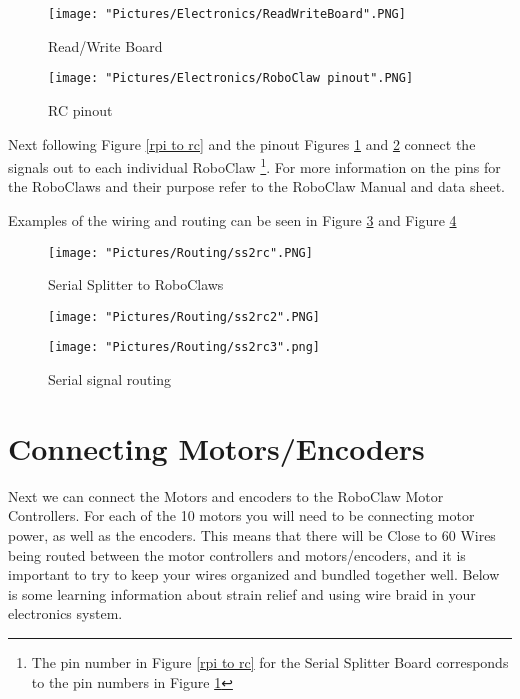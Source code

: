 \documentclass[12pt]{article}
\begin{document}
\begin{figure}[H]
 	\centering
	\texttt{[image: "Pictures/Electronics/ReadWriteBoard".PNG]}
 	\caption{Read/Write Board}
	\label{Read/Write Board}
\end{figure}

\begin{figure}[H]
 	\centering
	\texttt{[image: "Pictures/Electronics/RoboClaw pinout".PNG]}
 	\caption{RC pinout}
	\label{RC pinout}
\end{figure}

Next following Figure \ref{rpi to rc} and the pinout Figures \ref{Read/Write Board} and \ref{RC pinout} connect the signals out to each individual RoboClaw \footnote{The pin number in Figure \ref{rpi to rc} for the Serial Splitter Board corresponds to the pin numbers in Figure \ref{Read/Write Board}}. For more information on the pins for the RoboClaws and their purpose refer to the RoboClaw Manual and data sheet. 

\noindent Examples of the wiring and routing can be seen in Figure \ref{ss2rc1} and Figure \ref{ss2rc2}

\begin{figure}[H]
 	\centering
	\texttt{[image: "Pictures/Routing/ss2rc".PNG]}
 	\caption{Serial Splitter to RoboClaws}
	\label{ss2rc1}
\end{figure}

\begin{figure}[H]
 	\centering
  	\begin{minipage}[b]{0.50\textwidth}
		\texttt{[image: "Pictures/Routing/ss2rc2".PNG]}
  	\end{minipage}
  	\hfill
  	\begin{minipage}[b]{0.40\textwidth}
    		\texttt{[image: "Pictures/Routing/ss2rc3".png]}
  	\end{minipage}
	\caption{Serial signal routing}
	\label{ss2rc2}
\end{figure}

\section{Connecting Motors/Encoders}

Next we can connect the Motors and encoders to the RoboClaw Motor Controllers. For each of the 10 motors you will need to be connecting motor power, as well as the encoders. This means that there will be Close to 60 Wires being routed between the motor controllers and motors/encoders, and it is important to try to keep your wires organized and bundled together well. Below is some learning information about strain relief and using wire braid in your electronics system.
\end{document}
